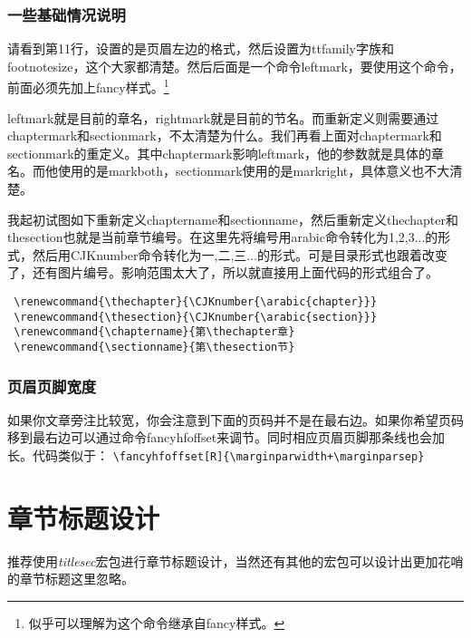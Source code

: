 \subsubsection{一些基础情况说明}
请看到第11行，设置的是页眉左边的格式，然后设置为ttfamily字族和footnotesize，这个大家都清楚。然后后面是一个命令leftmark，要使用这个命令，前面必须先加上fancy样式。\footnote{似乎可以理解为这个命令继承自fancy样式。}

leftmark就是目前的章名，rightmark就是目前的节名。而重新定义则需要通过chaptermark和sectionmark，不太清楚为什么。我们再看上面对chaptermark和sectionmark的重定义。其中chaptermark影响leftmark，他的参数就是具体的章名。而他使用的是markboth，sectionmark使用的是markright，具体意义也不大清楚。

我起初试图如下重新定义chaptername和sectionname，然后重新定义thechapter和thesection也就是当前章节编号。在这里先将编号用arabic命令转化为1,2,3...的形式，然后用CJKnumber命令转化为一,二,三...的形式。可是目录形式也跟着改变了，还有图片编号。影响范围太大了，所以就直接用上面代码的形式组合了。
\begin{verbatim}
 \renewcommand{\thechapter}{\CJKnumber{\arabic{chapter}}}
 \renewcommand{\thesection}{\CJKnumber{\arabic{section}}}
 \renewcommand{\chaptername}{第\thechapter章}
 \renewcommand{\sectionname}{第\thesection节}
\end{verbatim}

\subsubsection{页眉页脚宽度}
如果你文章旁注比较宽，你会注意到下面的页码并不是在最右边。如果你希望页码移到最右边可以通过命令fancyhfoffset来调节。同时相应页眉页脚那条线也会加长。代码类似于：
\verb|\fancyhfoffset[R]{\marginparwidth+\marginparsep}|


\section{章节标题设计}
推荐使用\emph{titlesec}宏包进行章节标题设计，当然还有其他的宏包可以设计出更加花哨的章节标题这里忽略。

